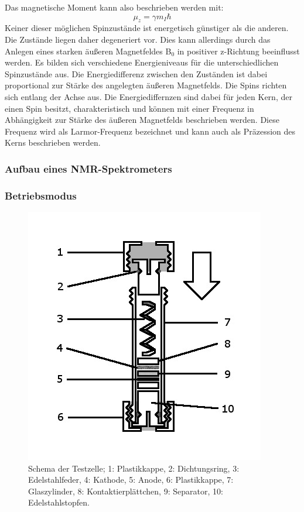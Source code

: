 \documentclass[a4paper, 11pt, headsepline,footsepline,twoside,abstract]{scrbook}
\begin{document}
Das magnetische Moment kann also beschrieben werden mit:
\begin{equation}
\mu_z = \gamma m_I \hbar
\end{equation}
Keiner dieser möglichen Spinzustände ist energetisch günstiger als die anderen. Die Zustände liegen daher degeneriert vor. Dies kann allerdings durch das Anlegen eines starken äußeren Magnetfeldes B$_0$ in positiver z-Richtung beeinflusst werden. Es bilden sich verschiedene Energieniveaus für die unterschiedlichen Spinzustände aus. Die Energiedifferenz zwischen den Zuständen ist dabei proportional zur Stärke des angelegten äußeren Magnetfelds. Die Spins richten sich entlang der Achse aus. Die Energiediffernzen sind dabei für jeden Kern, der einen Spin besitzt, charakteristisch und können mit einer Frequenz in Abhängigkeit zur Stärke des äußeren Magnetfelds beschrieben werden. Diese Frequenz wird als Larmor-Frequenz bezeichnet und kann auch als Präzession des Kerns beschrieben werden.
\subsubsection{Aufbau eines NMR-Spektrometers}
\subsubsection{Betriebsmodus}

\begin{figure}[h]
	\centering
	\includegraphics[width=0.7\columnwidth]{images/Schema_Zelle.jpg}
	\caption{Schema der Testzelle; 
			1: Plastikkappe,
			2: Dichtungsring,
			3: Edelstahlfeder,
			4: Kathode,
			5: Anode,
			6: Plastikkappe,
			7: Glaszylinder,
			8: Kontaktierplättchen,
			9: Separator,
			10: Edelstahlstopfen.
			}
	\label{schema_zelle}
\end{figure}
\end{document}
